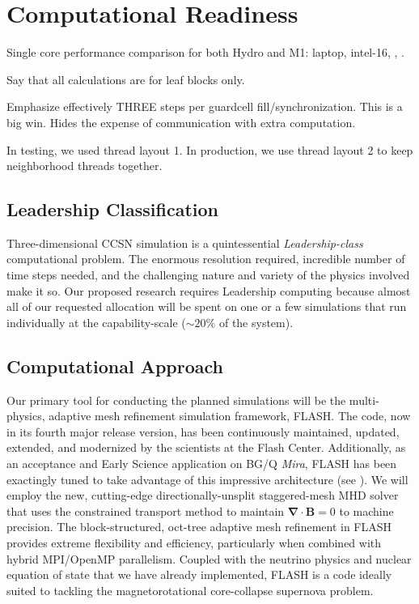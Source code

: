 \section{Computational Readiness}
\label{sec:readiness}

Single core performance comparison for both Hydro and M1: laptop, intel-16, \mira, \thet.

Say that all calculations are for leaf blocks only.

Emphasize effectively THREE steps per guardcell fill/synchronization. This is a big win. Hides the expense of communication with extra computation.

In testing, we used thread layout 1. In production, we use thread layout 2 to keep neighborhood threads together.

\subsection{Leadership Classification}
Three-dimensional CCSN simulation is a quintessential {\it
  Leadership-class} computational problem. The enormous resolution
required, incredible number of time steps needed, and the challenging
nature and variety of the physics involved make it so. Our proposed
research requires Leadership computing because almost all of our requested allocation
will be spent on one or a few simulations that run individually at the
capability-scale ($\sim20\%$ of the system).

\subsection{Computational Approach}
\label{sec:approach}

Our primary tool for conducting the planned simulations will be the multi-physics, adaptive mesh refinement simulation framework, FLASH.
The code, now in its fourth major release version, has been continuously maintained, updated, extended, and modernized by the scientists at the Flash Center.
Additionally, as an acceptance and Early Science application on BG/Q {\it Mira}, FLASH has been exactingly tuned to take advantage of this impressive architecture (see \citet{Daley:2013esp}).
We will employ the new, cutting-edge directionally-unsplit staggered-mesh MHD solver \citep{Lee:2013cd} that uses the constrained transport method to maintain $\pmb{\nabla \cdot B} = 0$ to machine precision.
The block-structured, oct-tree adaptive mesh refinement in FLASH provides extreme flexibility and efficiency, particularly when combined with hybrid MPI/OpenMP parallelism.
Coupled with the neutrino physics and nuclear equation of state that we have already implemented, FLASH is a code ideally suited to tackling the magnetorotational core-collapse supernova problem.

